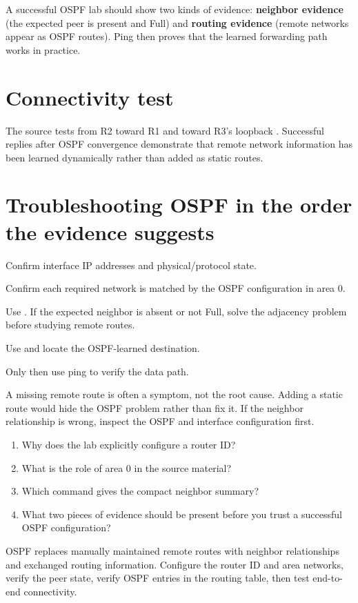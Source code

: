 
\begin{verifybox}
A successful OSPF lab should show two kinds of evidence: \textbf{neighbor evidence} (the expected peer is present and Full) and \textbf{routing evidence} (remote networks appear as OSPF routes). Ping then proves that the learned forwarding path works in practice.
\end{verifybox}

\section{Connectivity test}
The source tests from R2 toward R1 and toward R3's loopback . Successful replies after OSPF convergence demonstrate that remote network information has been learned dynamically rather than added as static routes.

\section{Troubleshooting OSPF in the order the evidence suggests}
\begin{netsteps}
\item Confirm interface IP addresses and physical/protocol state.
\item Confirm each required network is matched by the OSPF configuration in area 0.
\item Use . If the expected neighbor is absent or not Full, solve the adjacency problem before studying remote routes.
\item Use  and locate the OSPF-learned destination.
\item Only then use ping to verify the data path.
\end{netsteps}

\begin{pitfall}
A missing remote route is often a symptom, not the root cause. Adding a static route would hide the OSPF problem rather than fix it. If the neighbor relationship is wrong, inspect the OSPF and interface configuration first.
\end{pitfall}

\begin{quickcheck}
\begin{enumerate}
\item Why does the lab explicitly configure a router ID?
\item What is the role of area 0 in the source material?
\item Which command gives the compact neighbor summary?
\item What two pieces of evidence should be present before you trust a successful OSPF configuration?
\end{enumerate}
\end{quickcheck}

\begin{chapterrecap}
OSPF replaces manually maintained remote routes with neighbor relationships and exchanged routing information. Configure the router ID and area networks, verify the peer state, verify OSPF entries in the routing table, then test end-to-end connectivity.
\end{chapterrecap}
